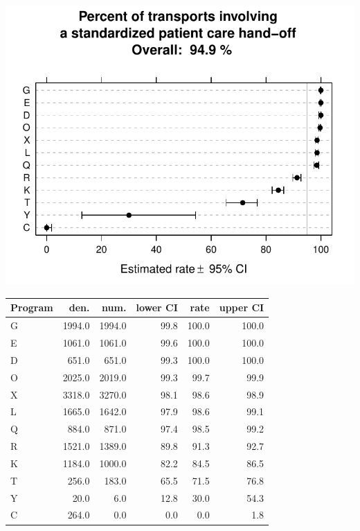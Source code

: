 \documentclass[twoside]{article}\usepackage[]{graphicx}\usepackage[]{color}
\makeatletter
\def\maxwidth{ %
  \ifdim\Gin@nat@width>\linewidth
    \linewidth
  \else
    \Gin@nat@width
  \fi
}
\newenvironment{knitrout}{}{} %
\makeatother
\begin{document}
\begin{center}
\begin{knitrout}
\color{fgcolor}
\includegraphics[width=\maxwidth]{figure/r_standardized_handoff} 

\end{knitrout}

\end{center}

\begin{table}[ht]
\centering
\begin{tabular}{lrrrrr}
  \hline
Program & den. & num. & lower CI & rate & upper CI \\ 
  \hline
G & 1994.0 & 1994.0 & 99.8 & 100.0 & 100.0 \\ 
  E & 1061.0 & 1061.0 & 99.6 & 100.0 & 100.0 \\ 
  D & 651.0 & 651.0 & 99.3 & 100.0 & 100.0 \\ 
  O & 2025.0 & 2019.0 & 99.3 & 99.7 & 99.9 \\ 
  X & 3318.0 & 3270.0 & 98.1 & 98.6 & 98.9 \\ 
  L & 1665.0 & 1642.0 & 97.9 & 98.6 & 99.1 \\ 
  Q & 884.0 & 871.0 & 97.4 & 98.5 & 99.2 \\ 
  R & 1521.0 & 1389.0 & 89.8 & 91.3 & 92.7 \\ 
  K & 1184.0 & 1000.0 & 82.2 & 84.5 & 86.5 \\ 
  T & 256.0 & 183.0 & 65.5 & 71.5 & 76.8 \\ 
  Y & 20.0 & 6.0 & 12.8 & 30.0 & 54.3 \\ 
  C & 264.0 & 0.0 & 0.0 & 0.0 & 1.8 \\ 
   \hline
\end{tabular}
\end{table}
\end{document}

